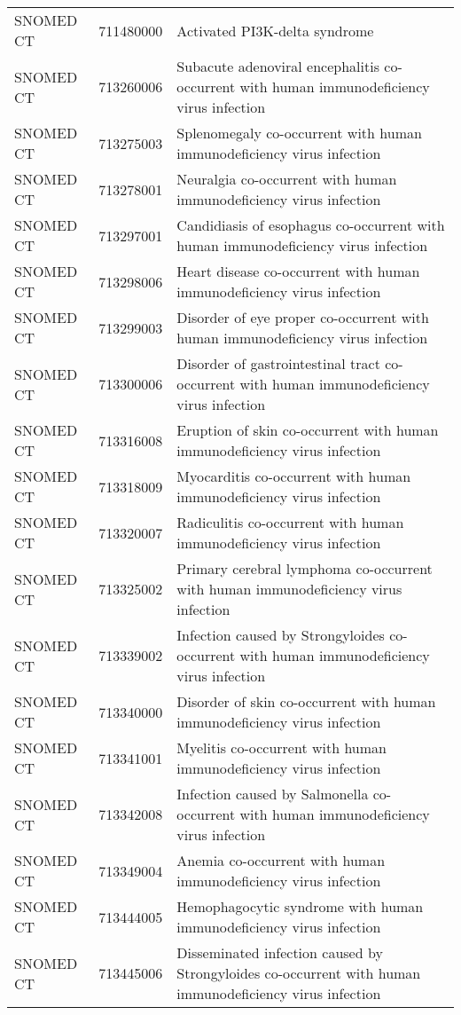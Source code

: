 \begin{longtable}{p{}p{}p{}}
  SNOMED CT & 711480000 & Activated PI3K-delta syndrome \\ 
  SNOMED CT & 713260006 & Subacute adenoviral encephalitis co-occurrent with human immunodeficiency virus infection \\ 
  SNOMED CT & 713275003 & Splenomegaly co-occurrent with human immunodeficiency virus infection \\ 
  SNOMED CT & 713278001 & Neuralgia co-occurrent with human immunodeficiency virus infection \\ 
  SNOMED CT & 713297001 & Candidiasis of esophagus co-occurrent with human immunodeficiency virus infection \\ 
  SNOMED CT & 713298006 & Heart disease co-occurrent with human immunodeficiency virus infection \\ 
  SNOMED CT & 713299003 & Disorder of eye proper co-occurrent with human immunodeficiency virus infection \\ 
  SNOMED CT & 713300006 & Disorder of gastrointestinal tract co-occurrent with human immunodeficiency virus infection \\ 
  SNOMED CT & 713316008 & Eruption of skin co-occurrent with human immunodeficiency virus infection \\ 
  SNOMED CT & 713318009 & Myocarditis co-occurrent with human immunodeficiency virus infection \\ 
  SNOMED CT & 713320007 & Radiculitis co-occurrent with human immunodeficiency virus infection \\ 
  SNOMED CT & 713325002 & Primary cerebral lymphoma co-occurrent with human immunodeficiency virus infection \\ 
  SNOMED CT & 713339002 & Infection caused by Strongyloides co-occurrent with human immunodeficiency virus infection \\ 
  SNOMED CT & 713340000 & Disorder of skin co-occurrent with human immunodeficiency virus infection \\ 
  SNOMED CT & 713341001 & Myelitis co-occurrent with human immunodeficiency virus infection \\ 
  SNOMED CT & 713342008 & Infection caused by Salmonella co-occurrent with human immunodeficiency virus infection \\ 
  SNOMED CT & 713349004 & Anemia co-occurrent with human immunodeficiency virus infection \\ 
  SNOMED CT & 713444005 & Hemophagocytic syndrome with human immunodeficiency virus infection \\ 
  SNOMED CT & 713445006 & Disseminated infection caused by Strongyloides co-occurrent with human immunodeficiency virus infection \\ 

\end{longtable}
